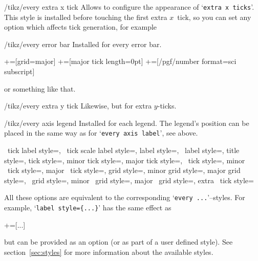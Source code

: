 \begin{stylekey}{/tikz/every extra x tick}
 Allows to configure the appearance of `\texttt{extra x ticks}'. This style is installed before touching the first extra $x$~tick, so you can set any option which affects tick generation, for example
\end{stylekey}

\begin{stylekey}{/tikz/every error bar}
 Installed for every error bar.
\begin{codeexample}
+=[grid=major]
+=[major tick length=0pt]
+=[/pgf/number format=sci subscript]
\end{codeexample}
or something like that.
\end{stylekey}

\begin{stylekey}{/tikz/every extra y tick}
 Likewise, but for extra $y$-ticks.
\end{stylekey}

\begin{stylekey}{/tikz/every axis legend}
 Installed for each legend. The legend's position can be placed in the same way as for `\texttt{every axis label}', see above.
\end{stylekey}


\begin{pgfplotsxykeylist}{%
	\x\ tick label style=\marg{$\dots$},
	\x\ tick scale label style=\marg{$\dots$},
	label style=\marg{$\dots$},
	\x\ label style=\marg{$\dots$},
	title style=\marg{$\dots$},
	tick style=\marg{$\dots$},
	minor tick style=\marg{$\dots$},
	major tick style=\marg{$\dots$},
	\x\ tick style=\marg{$\dots$},
	minor \x\ tick style=\marg{$\dots$},
	major \x\ tick style=\marg{$\dots$},
	grid style=\marg{$\dots$},
	minor grid style=\marg{$\dots$},
	major grid style=\marg{$\dots$},
	\x\ grid style=\marg{$\dots$},
	minor \x\ grid style=\marg{$\dots$},
	major \x\ grid style=\marg{$\dots$},
	extra \x\ tick style=\marg{$\dots$}}

All these options are equivalent to the corresponding `\texttt{every ...}'--styles. For example, `\texttt{label style=\{...\}}' has the same effect as 
\begin{codeexample}
+=[...]
\end{codeexample}
but can be provided as an option (or as part of a user defined style).
See section~\ref{sec:styles} for more information about the available styles.
\end{pgfplotsxykeylist}

